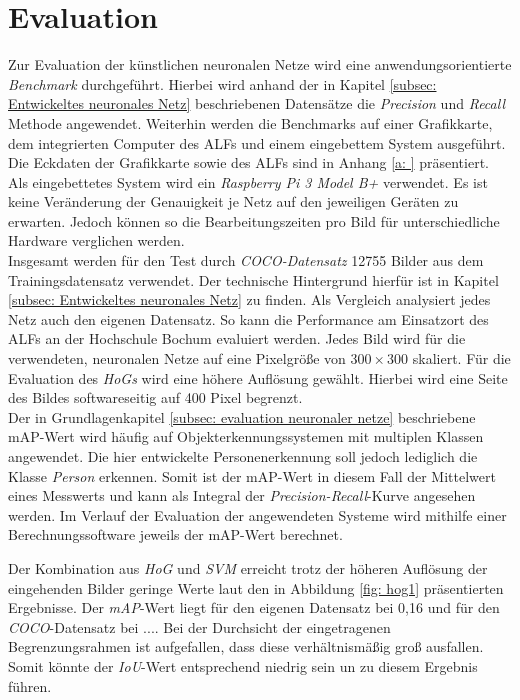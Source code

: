 \chapter{Evaluation}
\label{ch: Verifikation}
Zur Evaluation der künstlichen neuronalen Netze wird eine anwendungsorientierte \textit{Benchmark} durchgeführt. Hierbei wird anhand der in Kapitel \ref{subsec: Entwickeltes neuronales Netz} beschriebenen Datensätze die \textit{Precision} und \textit{Recall} Methode angewendet. Weiterhin werden die Benchmarks auf einer Grafikkarte, dem integrierten Computer des ALFs und einem eingebettem System ausgeführt. Die Eckdaten der Grafikkarte sowie des ALFs sind in Anhang \ref{a: } präsentiert. Als eingebettetes System wird ein \textit{Raspberry Pi 3 Model B+} verwendet. Es ist keine Veränderung der Genauigkeit je Netz auf den jeweiligen Geräten zu erwarten. Jedoch können so die Bearbeitungszeiten pro Bild für unterschiedliche Hardware verglichen werden. \\

Insgesamt werden für den Test durch \textit{COCO-Datensatz} 12755 Bilder aus dem Trainingsdatensatz verwendet. Der technische Hintergrund hierfür ist in Kapitel \ref{subsec: Entwickeltes neuronales Netz} zu finden. Als Vergleich analysiert jedes Netz auch den eigenen Datensatz. So kann die Performance am Einsatzort des ALFs an der Hochschule Bochum evaluiert werden. Jedes Bild wird für die verwendeten, neuronalen Netze auf eine Pixelgröße von $300 \times 300$ skaliert. Für die Evaluation des \textit{HoGs} wird eine höhere Auflösung gewählt. Hierbei wird eine Seite des Bildes softwareseitig auf 400 Pixel begrenzt.\\

Der in Grundlagenkapitel \ref{subsec: evaluation neuronaler netze} beschriebene mAP-Wert wird häufig auf Objekterkennungssystemen mit multiplen Klassen angewendet. Die hier entwickelte Personenerkennung soll jedoch lediglich die Klasse \textit{Person} erkennen. Somit ist der mAP-Wert in diesem Fall der Mittelwert eines Messwerts und kann als Integral der \textit{Precision-Recall}-Kurve angesehen werden. Im Verlauf der Evaluation der angewendeten Systeme wird mithilfe einer Berechnungssoftware jeweils der mAP-Wert berechnet.
 


Der Kombination aus \textit{HoG} und \textit{SVM} erreicht trotz der höheren Auflösung der eingehenden Bilder geringe Werte laut den in Abbildung \ref{fig: hog1} präsentierten Ergebnisse. Der \textit{mAP}-Wert liegt für den eigenen Datensatz bei 0,16 und für den \textit{COCO}-Datensatz bei .... Bei der Durchsicht der eingetragenen Begrenzungsrahmen ist aufgefallen, dass diese verhältnismäßig groß ausfallen. Somit könnte der \textit{IoU}-Wert entsprechend niedrig sein un zu diesem Ergebnis führen.


